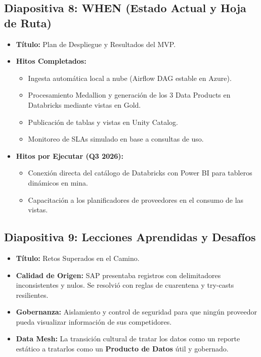 \documentclass[11pt,a4paper]{article}
\begin{document}
\subsection{Diapositiva 8: WHEN (Estado Actual y Hoja de Ruta)}
\begin{itemize}[label=$\bullet$]
    \item \textbf{Título:} Plan de Despliegue y Resultados del MVP.
    \item \textbf{Hitos Completados:}
    \begin{itemize}[label=--]
        \item Ingesta automática local a nube (Airflow DAG estable en Azure).
        \item Procesamiento Medallion y generación de los 3 Data Products en Databricks mediante vistas en Gold.
        \item Publicación de tablas y vistas en Unity Catalog.
        \item Monitoreo de SLAs simulado en base a consultas de uso.
    \end{itemize}
    \item \textbf{Hitos por Ejecutar (Q3 2026):}
    \begin{itemize}[label=--]
        \item Conexión directa del catálogo de Databricks con Power BI para tableros dinámicos en mina.
        \item Capacitación a los planificadores de proveedores en el consumo de las vistas.
    \end{itemize}
\end{itemize}

\subsection{Diapositiva 9: Lecciones Aprendidas y Desafíos}
\begin{itemize}[label=$\bullet$]
    \item \textbf{Título:} Retos Superados en el Camino.
    \item \textbf{Calidad de Origen:} SAP presentaba registros con delimitadores inconsistentes y nulos. Se resolvió con reglas de cuarentena y try-casts resilientes.
    \item \textbf{Gobernanza:} Aislamiento y control de seguridad para que ningún proveedor pueda visualizar información de sus competidores.
    \item \textbf{Data Mesh:} La transición cultural de tratar los datos como un reporte estático a tratarlos como un \textbf{Producto de Datos} útil y gobernado.
\end{itemize}
\end{document}
